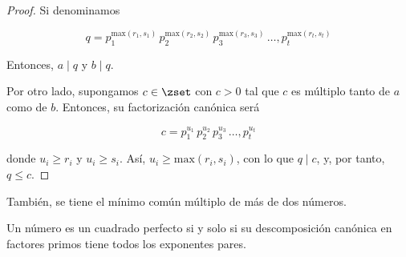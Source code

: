 \begin{proof}
  Si denominamos

  $$ q = p_1^{\mathrm{max}(r_1, s_1)} \, p_2^{\mathrm{max}(r_2, s_2)} \,
  p_3^{\mathrm{max}(r_3, s_3)} \, \ldots, p_t^{\mathrm{max}(r_t, s_t)} $$

  Entonces, $a \mid q$ y $b \mid q$.

  Por otro lado, supongamos $c \in \zset$ con $c > 0$ tal que $c$ es
  múltiplo tanto de $a$ como de $b$. Entonces, su factorización canónica
  será

  $$ c = p_1^{u_1} \, p_2^{u_2} \, p_3^{u_3} \, \ldots, p_t^{u_t} $$

  \noindent donde $u_i \geq r_i$ y $u_i \geq s_i$. Así, $u_i \geq
  \mathrm{max}(r_i, s_i)$, con lo que $q \mid c$, y, por tanto, $q \leq c$.
\end{proof}

También, se tiene el mínimo común múltiplo de más de dos números.

\begin{proposition}
  Un número es un cuadrado perfecto si y solo si su descomposición canónica
  en factores primos tiene todos los exponentes pares.
\end{proposition}

